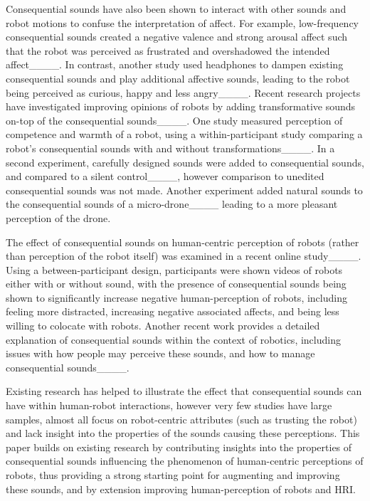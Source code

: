 Consequential sounds have also been shown to interact with other sounds and robot motions to confuse the interpretation of affect. For example, low-frequency consequential sounds created a negative valence and strong arousal affect such that the robot was perceived as frustrated and overshadowed the intended affect____. In contrast, another study used headphones to dampen existing consequential sounds and play additional affective sounds, leading to the robot being perceived as curious, happy and less angry____. Recent research projects have investigated improving opinions of robots by adding transformative sounds on-top of the consequential sounds____. One study measured perception of competence and warmth of a robot, using a within-participant study comparing a robot's consequential sounds with and without transformations____. In a second experiment, carefully designed sounds were added to consequential sounds, and compared to a silent control____, however comparison to unedited consequential sounds was not made. Another experiment added natural sounds to the consequential sounds of a micro-drone____ leading to a more pleasant perception of the drone.

The effect of consequential sounds on human-centric perception of robots (rather than perception of the robot itself) was examined in a recent online study____. Using a between-participant design, participants were shown videos of robots either with or without sound, with the presence of consequential sounds being shown to significantly increase negative human-perception of robots, including feeling more distracted, increasing negative associated affects, and being less willing to colocate with robots. Another recent work provides a detailed explanation of consequential sounds within the context of robotics, including issues with how people may perceive these sounds, and how to manage consequential sounds____.

Existing research has helped to illustrate the effect that consequential sounds can have within human-robot interactions, however very few studies have large samples, almost all focus on robot-centric attributes (such as trusting the robot) and lack insight into the properties of the sounds causing these perceptions. This paper builds on existing research by contributing insights into the properties of consequential sounds influencing the phenomenon of human-centric perceptions of robots, thus providing a strong starting point for augmenting and improving these sounds, and by extension improving human-perception of robots and HRI.